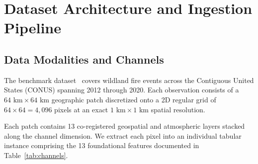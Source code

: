 \documentclass[10pt,journal,compsoc]{IEEEtran}
\begin{document}
\section{Dataset Architecture and Ingestion Pipeline}

\subsection{Data Modalities and Channels}
The benchmark dataset~\cite{huot2022nextday} covers wildland fire events across the Contiguous United States (CONUS) spanning 2012 through 2020. Each observation consists of a $64\text{ km} \times 64\text{ km}$ geographic patch discretized onto a 2D regular grid of $64 \times 64 = 4,096$ pixels at an exact $1\text{ km} \times 1\text{ km}$ spatial resolution. 

Each patch contains 13 co-registered geospatial and atmospheric layers stacked along the channel dimension. We extract each pixel into an individual tabular instance comprising the 13 foundational features documented in Table~\ref{tab:channels}.
\end{document}
